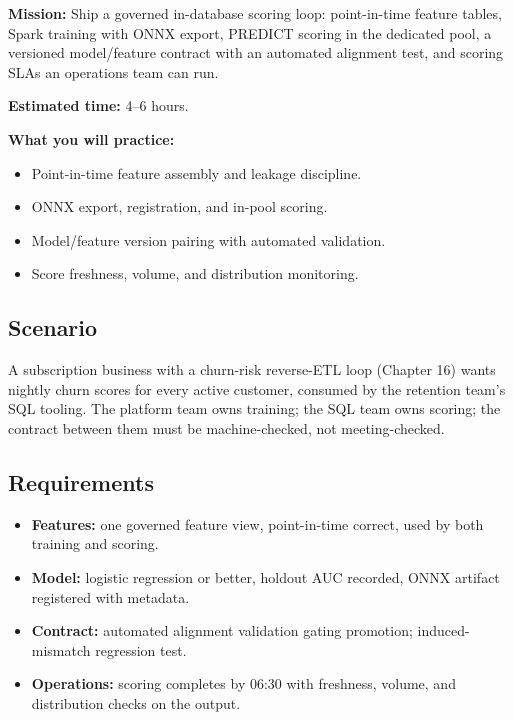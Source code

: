 \begin{capstonebox}
\textbf{Mission:} Ship a governed in-database scoring loop: point-in-time feature tables, Spark training with ONNX export, PREDICT scoring in the dedicated pool, a versioned model/feature contract with an automated alignment test, and scoring SLAs an operations team can run.

\textbf{Estimated time:} 4--6 hours.

\textbf{What you will practice:}
\begin{itemize}
    \item Point-in-time feature assembly and leakage discipline.
    \item ONNX export, registration, and in-pool scoring.
    \item Model/feature version pairing with automated validation.
    \item Score freshness, volume, and distribution monitoring.
\end{itemize}
\end{capstonebox}

\subsection*{Scenario}
A subscription business with a churn-risk reverse-ETL loop (Chapter 16) wants nightly churn scores for every active customer, consumed by the retention team's SQL tooling. The platform team owns training; the SQL team owns scoring; the contract between them must be machine-checked, not meeting-checked.

\subsection*{Requirements}
\begin{itemize}
    \item \textbf{Features:} one governed feature view, point-in-time correct, used by both training and scoring.
    \item \textbf{Model:} logistic regression or better, holdout AUC recorded, ONNX artifact registered with metadata.
    \item \textbf{Contract:} automated alignment validation gating promotion; induced-mismatch regression test.
    \item \textbf{Operations:} scoring completes by 06:30 with freshness, volume, and distribution checks on the output.
\end{itemize}

